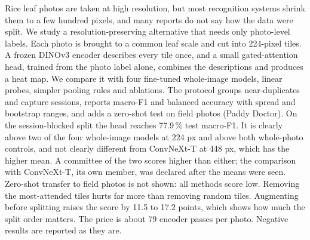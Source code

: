 Rice leaf photos are taken at high resolution, but most recognition systems shrink them to a few
hundred pixels, and many reports do not say how the data were split.
We study a resolution-preserving alternative that needs only photo-level labels. Each photo is
brought to a common leaf scale and cut into 224-pixel tiles. A frozen DINOv3 encoder describes every tile once,
and a small gated-attention head, trained from the photo label alone, combines the descriptions and
produces a heat map. We compare it with four fine-tuned whole-image models, linear probes, simpler pooling rules and
ablations. The protocol groups near-duplicates and capture sessions, reports macro-F1 and balanced accuracy with
spread and bootstrap ranges, and adds a zero-shot test on field photos (Paddy Doctor).
On the session-blocked split the head reaches 77.9\,\% test macro-F1. It is clearly above two of the four
whole-image models at 224 px and above both whole-photo controls, and not clearly different from ConvNeXt-T at
448 px, which has the higher mean. A committee of the two scores higher than either; the comparison with ConvNeXt-T, its own member, was declared after the means were seen.
Zero-shot transfer to field photos is not shown: all methods score low.
Removing the most-attended tiles hurts far more than removing random tiles.
Augmenting before splitting raises the score by 11.5 to 17.2 points, which shows how much the split order matters.
The price is about 79 encoder passes per photo. Negative results are reported as they are.
